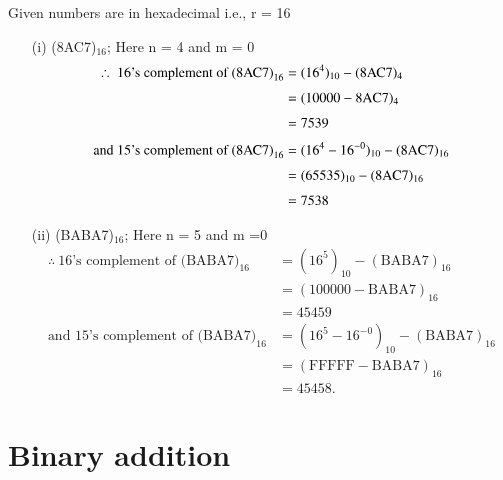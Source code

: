 \begin{solution}
Given numbers are in hexadecimal i.e., r = 16
\begin{itemize}
\item[(i)] (8AC7)$_{16}$\qquad ; Here n = 4 and m = 0
\begin{align*}
\therefore~ \text{16's complement of (8AC7)}_{16} &= (16^{4})_{10}-(\text{8AC7})_{4}\\[3pt]
&= (10000-8\textrm{A}\textrm{C} 7)_{4}\\[3pt]
&= 7539\\[3pt]
\text{and 15's complement of (8AC7)}_{16} &= (16^{4}-16^{-0})_{10}-(8\textrm{A}\textrm{C} 7)_{16}\\[3pt]
&= (65535)_{10}-(8\textrm{A}\textrm{C} 7)_{16}\\[3pt]
&= 7538
\end{align*}

\item[(ii)] (BABA7)$_{16}$\qquad ; Here n = 5 and m =0
\begin{align*}
\therefore~ \text{16's complement of (BABA7)}_{16} &= (16^{5})_{10}-(\text{BABA7})_{16}\\[3pt]
&= (100000-\text{BABA7})_{16}\\[3pt]
&= 45459\\[3pt]
\text{and 15's complement of (BABA7)}_{16} &= (16^{5}-16^{-0})_{10}-(\text{BABA7})_{16}\\[3pt]
&= (\text{FFFFF}-\text{BABA7})_{16}\\[3pt]
&= 45458.
\end{align*}
\end{itemize}
\end{solution}

\section{Binary addition}\label{sec5.5}


